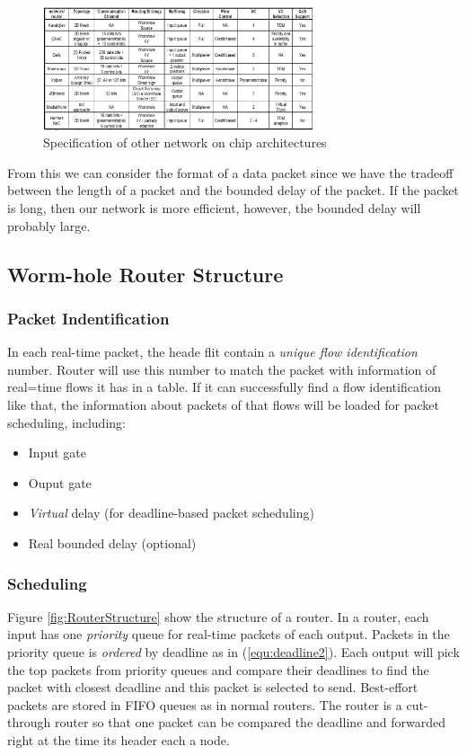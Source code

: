 \documentclass[conference, twocolumn]{IEEEtran}
\theoremstyle{definition}
\begin{document}
\begin{figure}[htp]
\centering
\includegraphics[width=8cm]{pics/OtherArcs.png}
\caption[Other Spec.]
{Specification of other network on chip architectures}\label{fig:otherSpec}
\end{figure}

From this we can consider the format of a data packet since we have the 
tradeoff between the length of a packet and the bounded delay of the packet. 
If the packet is long, then our network is more efficient, however, the bounded 
delay will probably large.

\subsection{Worm-hole Router Structure}
\subsubsection{Packet Indentification}
In each real-time packet, the heade flit contain a {\em unique flow
identification} number. Router will use this number to match the packet with
information of real=time flows it has in a table. If it can successfully find a
flow identification like that, the information about packets of that flows will
be loaded  for packet scheduling, including:
\begin{itemize}
  \item Input gate
  \item Ouput gate
  \item {\em Virtual} delay (for deadline-based packet scheduling)
  \item Real bounded delay (optional)
\end{itemize}

\subsubsection{Scheduling}
Figure \ref{fig:RouterStructure} show the structure of a router. In a router,
each input has one {\em priority} queue for real-time packets of each output.
Packets in the priority queue is {\em ordered} by deadline as in
(\ref{equ:deadline2}). Each output will pick the top packets from priority
queues and compare their deadlines to find the packet with closest deadline and this
packet is selected to send. Best-effort packets are stored in FIFO queues as in
normal routers. The router is a cut-through router so that one packet can be
compared the deadline and forwarded right at the time its header each a node.
\end{document}
